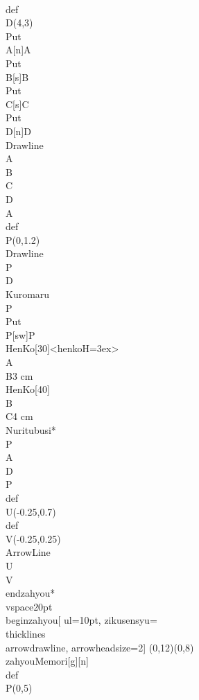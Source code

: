    \\def\\D{(4,3)}
   \\Put\\A[n]{A}
   \\Put\\B[s]{B}
   \\Put\\C[s]{C}
   \\Put\\D[n]{D}
   \\Drawline{\\A\\B\\C\\D\\A}
   \\def\\P{(0,1.2)}
   \\Drawline{\\P\\D}
   \\Kuromaru\\P
   \\Put\\P[sw]{P}
   \\HenKo[30]<henkoH=3ex>\\A\\B{3 cm}
   \\HenKo[40]\\B\\C{4 cm}
   \\Nuritubusi*{\\P\\A\\D\\P}
   \\def\\U{(-0.25,0.7)}
   \\def\\V{(-0.25,0.25)}
   \\ArrowLine\\U\\V
  \\end{zahyou*}
  \\vspace{20pt}
  \\begin{zahyou}[%
   ul=10pt,%
   zikusensyu=\\thicklines\\arrowdrawline,%
   arrowheadsize=2]
   (0,12)(0,8)%
   \\zahyouMemori[g][n]%
   \\def\\P{(0,5)}
